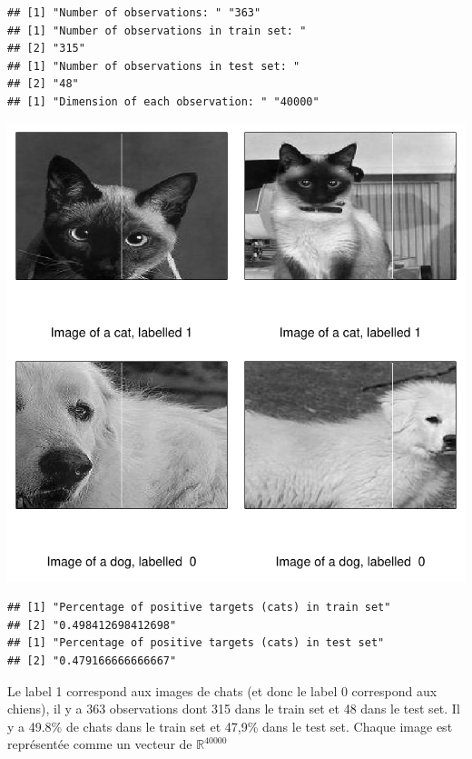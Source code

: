 \documentclass[10pt,a4paper]{report}\usepackage[]{graphicx}\usepackage[]{color}
\makeatletter
\def\maxwidth{ %
  \ifdim\Gin@nat@width>\linewidth
    \linewidth
  \else
    \Gin@nat@width
  \fi
}
\newenvironment{kframe}{%
 \def\at@end@of@kframe{}%
 \ifinner\ifhmode%
  \def\at@end@of@kframe{\end{minipage}}%
  \begin{minipage}{\columnwidth}%
 \fi\fi%
 \def\FrameCommand##1{\hskip\@totalleftmargin \hskip-\fboxsep
 \colorbox{shadecolor}{##1}\hskip-\fboxsep
     \hskip-\linewidth \hskip-\@totalleftmargin \hskip\columnwidth}%
 \MakeFramed {\advance\hsize-\width
   \@totalleftmargin\z@ \linewidth\hsize
   \@setminipage}}%
 {\par\unskip\endMakeFramed%
 \at@end@of@kframe}
\newenvironment{knitrout}{}{} %
\makeatother
\begin{document}
\begin{knitrout}
\color{fgcolor}\begin{kframe}
\begin{verbatim}
## [1] "Number of observations: " "363"
## [1] "Number of observations in train set: "
## [2] "315"
## [1] "Number of observations in test set: "
## [2] "48"
## [1] "Dimension of each observation: " "40000"
\end{verbatim}
\end{kframe}
\includegraphics[width=\maxwidth]{figure/unnamed-chunk-2-1} 
\begin{kframe}\begin{verbatim}
## [1] "Percentage of positive targets (cats) in train set"
## [2] "0.498412698412698"
## [1] "Percentage of positive targets (cats) in test set"
## [2] "0.479166666666667"
\end{verbatim}
\end{kframe}
\end{knitrout}

Le label 1 correspond aux images de chats (et donc le label 0 correspond aux chiens), il y a 363 observations dont 315 dans le train set et 48 dans le test set. Il y a 49.8\% de chats dans le train set et 47,9\% dans le test set. Chaque image est représentée comme un vecteur de $\mathbb{R}^{40000}$
\end{document}

